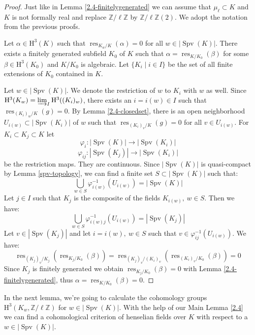 \begin{proof}
Just like in Lemma \ref{2.4-finitelygenerated} we can assume that $\mu_\ell\subset K$ and $K$ is not formally real and replace $\mathbb{Z}/\ell\mathbb{Z}$ by $\mathbb{Z}/\ell\mathbb{Z}(2)$. We adopt the notation from the previous proofs.

Let $\alpha\in\mathrm{H}^3(K)$ such that $\operatorname{res}_{K_w/K}(\alpha) = 0$ for all $w\in |\operatorname{Spv}(K)|$. There exists a finitely generated subfield $K_0$ of $K$ such that $\alpha = \operatorname{res}_{K/K_0}(\beta)$ for some $\beta\in\mathrm{H}^3(K_0)$ and $K/K_0$ is algebraic. Let $\{K_i\mid i\in I\}$ be the set of all finite extensions of $K_0$ contained in $K$.

Let $w\in |\operatorname{Spv}(K)|$. We denote the restriction of $w$ to $K_i$ with $w$ as well. Since $\mathrm{H}^3(K_w) = \varinjlim_I \mathrm{H}^3((K_i)_w)$, there exists an $i = i(w)\in I$ such that $\operatorname{res}_{(K_i)_w/K}(g) = 0$. By Lemma \ref{2.4-closedset}, there is an open neighborhood $U_{i(w)}\subset |\operatorname{Spv}(K_i)|$ of $w$ such that $\operatorname{res}_{(K_i)_v/K}(g)=0$ for all $v\in U_{i(w)}$. For $K_i\subset K_j\subset K$ let
\[ \varphi_i: |\operatorname{Spv}(K)| \to |\operatorname{Spv}(K_i)| \]
\[ \varphi_{ij}: |\operatorname{Spv}(K_j)|\to |\operatorname{Spv}(K_i)| \]
be the restriction maps. They are continuous. Since $|\operatorname{Spv}(K)|$ is quasi-compact by Lemma \ref{spv-topology}, we can find a finite set $S\subset |\operatorname{Spv}(K)|$ such that:
\[ \bigcup_{w\in S}\varphi^{-1}_{i(w)}(U_{i(w)}) = |\operatorname{Spv}(K)| \]
Let $j\in I$ such that $K_j$ is the composite of the fields $K_{i(w)},\ w\in S$. Then we have:
\[ \bigcup_{w\in S}\varphi^{-1}_{i(w)j}(U_{i(w)}) = |\operatorname{Spv}(K_j)| \]
Let $v\in |\operatorname{Spv}(K_j)|$ and let $i = i(w),\ w\in S$ such that $v\in\varphi_{ij}^{-1}(U_{i(w)})$. We have:
\[ \operatorname{res}_{(K_j)_v/K_j}(\operatorname{res}_{K_j/K_0}(\beta)) = \operatorname{res}_{(K_j)_v/(K_i)_v}(\operatorname{res}_{(K_i)_v/K_0}(\beta)) = 0 \]
Since $K_j$ is finitely generated we obtain $\operatorname{res}_{K_j/K_0}(\beta) = 0$ with Lemma \ref{2.4-finitelygenerated}, thus $\alpha = \operatorname{res}_{K/K_0}(\beta) = 0$.
\end{proof}

In the next lemma, we're going to calculate the cohomology groups $\mathrm{H}^3(K_w,\mathbb{Z}/\ell\mathbb{Z})$ for $w\in |\operatorname{Spv}(K)|$. With the help of our Main Lemma \ref{2.4} we can find a cohomological criterion of henselian fields over $K$ with respect to a $w\in |\operatorname{Spv}(K)|$.

